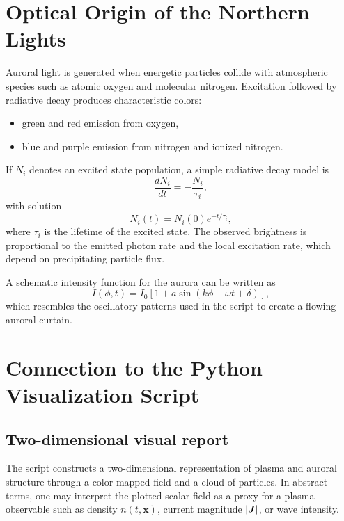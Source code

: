 \documentclass[11pt]{article}
\begin{document}
\section{Optical Origin of the Northern Lights}

Auroral light is generated when energetic particles collide with atmospheric species such as atomic oxygen and molecular nitrogen. Excitation followed by radiative decay produces characteristic colors:
\begin{itemize}
    \item green and red emission from oxygen,
    \item blue and purple emission from nitrogen and ionized nitrogen.
\end{itemize}

If \(N_i\) denotes an excited state population, a simple radiative decay model is
\begin{equation}
\frac{dN_i}{dt} = -\frac{N_i}{\tau_i},
\end{equation}
with solution
\begin{equation}
N_i(t) = N_i(0)e^{-t/\tau_i},
\end{equation}
where \(\tau_i\) is the lifetime of the excited state. The observed brightness is proportional to the emitted photon rate and the local excitation rate, which depend on precipitating particle flux.

A schematic intensity function for the aurora can be written as
\begin{equation}
I(\phi,t) = I_0 \left[1 + a\sin(k\phi - \omega t + \delta)\right],
\end{equation}
which resembles the oscillatory patterns used in the script to create a flowing auroral curtain.

\section{Connection to the Python Visualization Script}

\subsection{Two-dimensional visual report}
The script constructs a two-dimensional representation of plasma and auroral structure through a color-mapped field and a cloud of particles. In abstract terms, one may interpret the plotted scalar field as a proxy for a plasma observable such as density \(n(t,\bm{x})\), current magnitude \(\abs{\bm{J}}\), or wave intensity.
\end{document}
